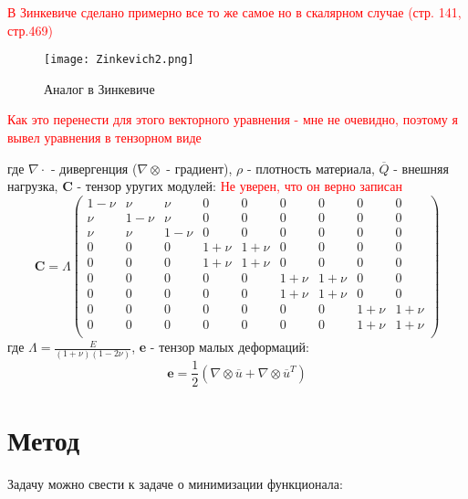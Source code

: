 \documentclass[a4paper,12pt]{article}
\begin{document}
\textcolor{red}{В Зинкевиче сделано примерно все то же самое но в скалярном случае (стр. 141, стр.469)}
\begin{figure}[H]
    \texttt{[image: Zinkevich2.png]}
    \caption{Аналог в Зинкевиче}
    \label{fig:enter-label}
\end{figure}
\textcolor{red}{Как это перенести для этого векторного уравнения - мне не очевидно, поэтому я вывел уравнения в тензорном виде} \par
где $\nabla \cdot$ - дивергенция ($\nabla \otimes $ - градиент), $\rho$ - плотность материала, $\overline{Q}$ - внешняя нагрузка, $\textbf{C}$ - тензор уругих модулей: \textcolor{red}{Не уверен, что он верно записан}
\begin{equation}
\textbf{C} = \Lambda
\begin{pmatrix}
    1-\nu & \nu & \nu &  0 & 0 &0 &0 &0 & 0 \\
    \nu & 1-\nu & \nu & 0 & 0 & 0 & 0&0 &0 \\
    \nu & \nu & 1-\nu & 0&0&0&0&0&0\\
    0 & 0 & 0 & 1+\nu & 1+\nu & 0 &0 &0&0 \\
    0 & 0 & 0 & 1+\nu & 1+\nu & 0 &0 &0&0 \\
    0&0 &0 &0 &0 &1+\nu &1+\nu &0 &0 \\
    0&0 &0 &0 &0 &1+\nu &1+\nu &0 &0 \\
    0&0 &0 &0 &0 &0 &0 &1+\nu &1+\nu \\
    0&0 &0 &0 &0 &0 &0 &1+\nu &1+\nu \\
    
\end{pmatrix}
\end{equation}
где $\Lambda = \frac{E}{(1+\nu)(1-2\nu)}$, \textbf{e} - тензор малых деформаций:
\begin{equation}
    \textbf{e} = \frac{1}{2}(\nabla \otimes \overline{u} + \nabla \otimes \overline{u}^T)
\end{equation}
\section{Метод}
Задачу можно свести к задаче о минимизации функционала:

        
\end{document}
